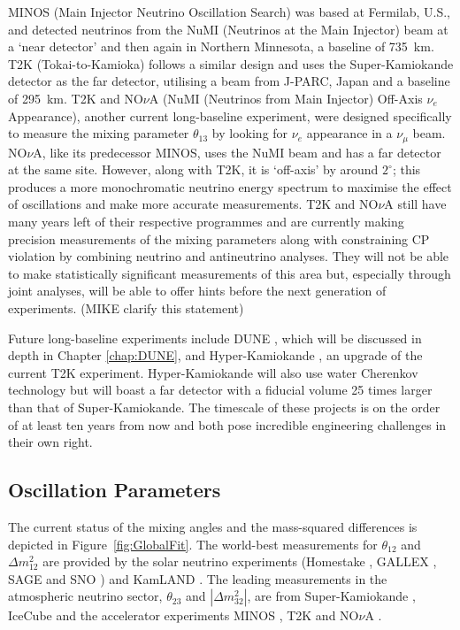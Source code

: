 MINOS (Main Injector Neutrino Oscillation Search) was based at Fermilab, U.S., and detected neutrinos from the NuMI (Neutrinos at the Main Injector) beam at a `near detector' and then again in Northern Minnesota, a baseline of 735~km.  T2K (Tokai-to-Kamioka) follows a similar design and uses the Super-Kamiokande detector as the far detector, utilising a beam from J-PARC, Japan and a baseline of 295~km.  T2K and NO$\nu$A (NuMI (Neutrinos from Main Injector) Off-Axis $\nu_e$ Appearance), another current long-baseline experiment, were designed specifically to measure the mixing parameter $\theta_{13}$ by looking for $\nu_e$ appearance in a $\nu_{\mu}$ beam.  NO$\nu$A, like its predecessor MINOS, uses the NuMI beam and has a far detector at the same site.  However, along with T2K, it is `off-axis' by around $2^{\circ}$; this produces a more monochromatic neutrino energy spectrum to maximise the effect of oscillations and make more accurate measurements.  T2K and NO$\nu$A still have many years left of their respective programmes and are currently making precision measurements of the mixing parameters along with constraining CP violation by combining neutrino and antineutrino analyses.  They will not be able to make statistically significant measurements of this area but, especially through joint analyses, will be able to offer hints before the next generation of experiments. (MIKE clarify this statement)

Future long-baseline experiments include DUNE \cite{DUNECDR1}, which will be discussed in depth in Chapter \ref{chap:DUNE}, and Hyper-Kamiokande \cite{HyperKamiokande2015}, an upgrade of the current T2K experiment.  Hyper-Kamiokande will also use water Cherenkov technology but will boast a far detector with a fiducial volume 25 times larger than that of Super-Kamiokande.  The timescale of these projects is on the order of at least ten years from now and both pose incredible engineering challenges in their own right.

\subsection{Oscillation Parameters}\label{sec:OscillationParameters}

The current status of the mixing angles and the mass-squared differences is depicted in Figure~\ref{fig:GlobalFit}.  The world-best measurements for $\theta_{12}$ and $\Delta m^2_{12}$ are provided by the solar neutrino experiments (Homestake \cite{Cleveland1995}, GALLEX \cite{Gallex2010}, SAGE \cite{Sage2009} and SNO \cite{SNO2013}) and KamLAND \cite{KamLAND2013}.  The leading measurements in the atmospheric neutrino sector, $\theta_{23}$ and $|\Delta m_{32}^2|$, are from Super-Kamiokande \cite{SuperKamiokande2010}, IceCube \cite{IceCube2015} and the accelerator experiments MINOS \cite{MINOS2013,MINOS2013b}, T2K \cite{T2Knumu2014} and NO$\nu$A \cite{NOvAnumu2016}.

